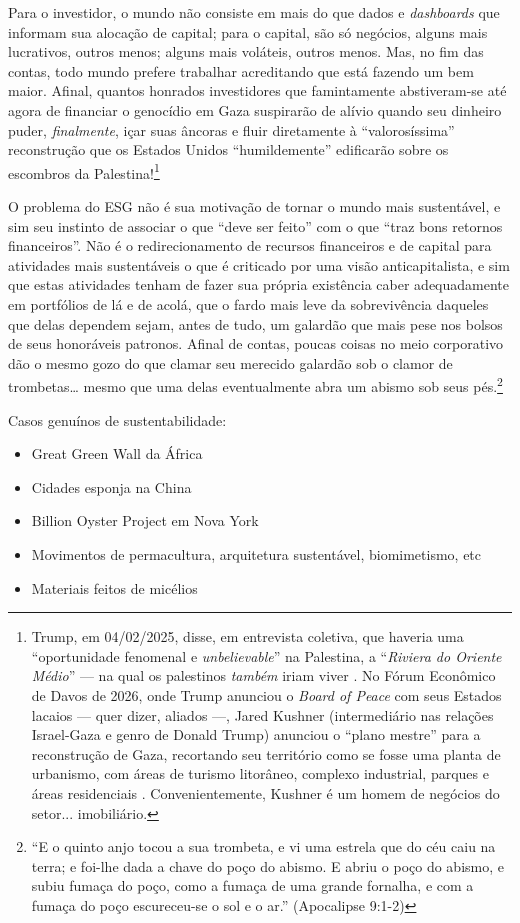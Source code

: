 \documentclass[12pt]{article}
\begin{document}
Para o investidor, o mundo não consiste em mais do que dados e \textit{dashboards} que informam sua alocação de capital; para o capital, são só negócios, alguns mais lucrativos, outros menos; alguns mais voláteis, outros menos. Mas, no fim das contas, todo mundo prefere trabalhar acreditando que está fazendo um bem maior. Afinal, quantos honrados investidores que famintamente abstiveram-se até agora de financiar o genocídio em Gaza suspirarão de alívio quando seu dinheiro puder, \textit{finalmente}, içar suas âncoras e fluir diretamente à “valorosíssima” reconstrução que os Estados Unidos “humildemente” edificarão sobre os escombros da Palestina!\footnote{Trump, em 04/02/2025, disse, em entrevista coletiva, que haveria uma ``oportunidade fenomenal e \textit{unbelievable}'' na Palestina, a ``\textit{Riviera do Oriente Médio}'' --- na qual os palestinos \textit{também} iriam viver \cite{CNBCTelevision2025}. No Fórum Econômico de Davos de 2026, onde Trump anunciou o \textit{Board of Peace} com seus Estados lacaios --- quer dizer, aliados ---, Jared Kushner (intermediário nas relações Israel-Gaza e genro de Donald Trump) anunciou o ``plano mestre'' para a reconstrução de Gaza, recortando seu território como se fosse uma planta de urbanismo, com áreas de turismo litorâneo, complexo industrial, parques e áreas residenciais \cite{Haddad2026}. Convenientemente, Kushner é um homem de negócios do setor... imobiliário.} 


O problema do ESG não é sua motivação de tornar o mundo mais sustentável, e sim seu instinto de associar o que ``deve ser feito'' com o que ``traz bons retornos financeiros''. Não é o redirecionamento de recursos financeiros e de capital para atividades mais sustentáveis o que é criticado por uma visão anticapitalista, e sim que estas atividades tenham de fazer sua própria existência caber adequadamente em portfólios de lá e de acolá, que o fardo mais leve da sobrevivência daqueles que delas dependem sejam, antes de tudo, um galardão que mais pese nos bolsos de seus honoráveis patronos. Afinal de contas, poucas coisas no meio corporativo dão o mesmo gozo do que clamar seu merecido galardão sob o clamor de trombetas… mesmo que uma delas eventualmente abra um abismo sob seus pés.\footnote{“E o quinto anjo tocou a sua trombeta, e vi uma estrela que do céu caiu na terra; e foi-lhe dada a chave do poço do abismo. E abriu o poço do abismo, e subiu fumaça do poço, como a fumaça de uma grande fornalha, e com a fumaça do poço escureceu-se o sol e o ar.” (Apocalipse 9:1-2)}

Casos genuínos de sustentabilidade:
\begin{itemize}
    \item Great Green Wall da África
    \item Cidades esponja na China
    \item Billion Oyster Project em Nova York
    \item Movimentos de permacultura, arquitetura sustentável, biomimetismo, etc
    \item Materiais feitos de micélios \cite{Bayer2019}
\end{itemize}
\end{document}

